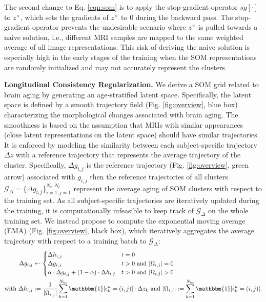 \documentclass[runningheads]{llncs}
\begin{document}
The second change to Eq. \ref{eqn:som} is to apply the stop-gradient operator $sg[\cdot]$ \cite{van2017neural} to $z^\times$, which sets the gradients of $z^\times$ to 0 during the backward pass. The stop-gradient operator prevents the undesirable scenario where $z^\times$ is pulled towards a naive solution, i.e., different MRI samples are mapped to the same weighted average of all image representations. This risk of deriving the naive solution is especially high in the early stages of the training when the SOM representations are randomly initialized and may not accurately represent the clusters.

\textbf{Longitudinal Consistency Regularization.} We derive a SOM grid related to brain aging by generating an age-stratified latent space. Specifically, the latent space is defined by a smooth trajectory field (Fig. \ref{fig:overview}, blue box) characterizing the morphological changes associated with brain aging. The smoothness is based on the assumption that MRIs with similar appearances (close latent representations on the latent space) should have similar trajectories. It is enforced by modeling the similarity between each subject-specific trajectory $\Delta z$ with a reference trajectory that represents the average trajectory of the cluster. Specifically, $\Delta g_{i,j}$ is the reference trajectory (Fig. \ref{fig:overview}, green arrow) associated with $g_{i,j}$ then the reference trajectories of all clusters $\mathcal{G}_{\Delta}=\{ \Delta g_{i,j} \}_{i=1,j=1}^{N_r,N_c}$ represent the average aging of SOM clusters with respect to the training set. As all subject-specific trajectories are iteratively updated during the training, it is computationally infeasible to keep track of $\mathcal{G}_{\Delta}$ on the whole training set. We instead propose to compute the exponential moving average (EMA) (Fig. \ref{fig:overview}, black box), which iteratively aggregates the average trajectory with respect to a training batch to $\mathcal{G}_{\Delta}$:
\begin{align*}
\label{eqn:ema}
\Delta g_{i,j} & \leftarrow 
 \begin{cases}
 \Delta h_{i,j} & t=0 \\
 \Delta g_{i,j} & t>0 \mbox{ and } |\Omega_{i,j}| = 0 \\
\alpha \cdot \Delta g_{i,j} + (1-\alpha) \cdot \Delta h_{i,j} & t>0 \mbox{ and } |\Omega_{i,j}| > 0\\
 \end{cases}\\
\mbox{with } \Delta h_{i,j} &:= \frac{1}{|\Omega_{i,j}|} \sum_{k=1}^{N_{bs}} \mathbbm{1}[\epsilon^u_k=(i,j)] \cdot \Delta z_k \mbox{ and } |\Omega_{i,j}|:=\sum_{k=1}^{N_{bs}} \mathbbm{1}[\epsilon^u_k=(i,j)].
\end{align*}
\end{document}
